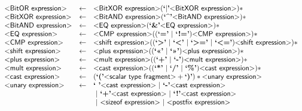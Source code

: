 \begin{figure}
\[\begin{array}{lcl}
  \text{\sf\textless BitOR expression\textgreater} & \gets & \text{\sf\textless BitXOR expression\textgreater} (\text{\bf`$|$'} \text{\sf\textless BitXOR expression\textgreater})*\\

  \text{\sf\textless BitXOR expression\textgreater} & \gets & \text{\sf\textless BitAND expression\textgreater} (\text{\bf`\textasciicircum'} \text{\sf\textless BitAND expression\textgreater})*\\

  \text{\sf\textless BitAND expression\textgreater} & \gets & \text{\sf\textless EQ expression\textgreater} (\text{\bf`\&'} \text{\sf\textless EQ expression\textgreater})*\\

  \text{\sf\textless EQ expression\textgreater} & \gets & \text{\sf\textless CMP expression\textgreater} ((\text{\bf`='}~|~\text{\bf`!='}) \text{\sf\textless CMP expression\textgreater})*\\

  \text{\sf\textless CMP expression\textgreater} & \gets & \text{\sf\textless shift expression\textgreater} (
               (\text{\bf`\textgreater'}
               ~|~\text{\bf`\textless'}
               ~|~\text{\bf`\textgreater='}
               ~|~\text{\bf`\textless='})
               \text{\sf\textless shift expression\textgreater})*\\

  \text{\sf\textless shift expression\textgreater} & \gets & \text{\sf\textless plus expression\textgreater} (
       (\text{\bf`\textless\textless'}~|~\text{\bf`\textgreater\textgreater'}) \text{\sf\textless plus expression\textgreater})*\\

  \text{\sf\textless plus expression\textgreater} & \gets & \text{\sf\textless mult expression\textgreater} ((\text{\bf`+'}~|~\text{\bf`-'}) \text{\sf\textless mult expression\textgreater})*\\

  \text{\sf\textless mult expression\textgreater} & \gets & \text{\sf\textless cast expression\textgreater} ((\text{\bf`*'}~|~\text{\bf`/'}~|~\text{\bf`\%'}) \text{\sf\textless cast expression\textgreater})*\\

  \text{\sf\textless cast expression\textgreater} & \gets & (\text{\bf`('} \text{\sf\textless scalar type fragment\textgreater}+ \text{\bf`)'})* \text{\sf\textless unary expression\textgreater}\\

  \text{\sf\textless unary expression\textgreater} & \gets & \text{\bf`~'} \text{\sf\textless cast expression\textgreater}
                              ~|~ \text{\bf`-'} \text{\sf\textless cast expression\textgreater}\\&&
                              ~|~ \text{\bf`+'} \text{\sf\textless cast expression\textgreater}
                              ~|~ \text{\bf`!'} \text{\sf\textless cast expression\textgreater}\\&&
                              ~|~ \text{\sf\textless sizeof expression\textgreater}
                              ~|~ \text{\sf\textless postfix expression\textgreater}\\


\end{array}\]
\end{figure}
